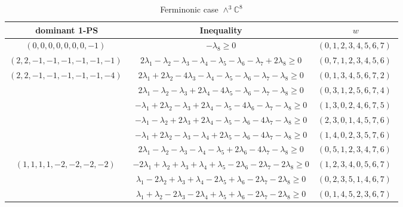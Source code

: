 \documentclass[11pt]{article}
\begin{document}
 
 \begin{longtable}[l]{|c|c|c|} 
 \caption{Ferminonic case $\wedge^{3}\mathbb{C}^{8}$} \\  
 
 \hline 
 \textrm{dominant 1-PS} & \textrm{Inequality} & $w$ \\ 
 \hline\multirow[t]{1}{*}{ $(0 ,0 ,0 ,0 ,0 ,0 ,0 ,-1) \;$ }  & $-\lambda_{8}\geq 0$ & $(0 ,1 ,2 ,3 ,4 ,5 ,6 ,7) \;$\\ \hline\multirow[t]{1}{*}{ $(2 ,2 ,-1 ,-1 ,-1 ,-1 ,-1 ,-1) \;$ }  & $2\lambda_{1}-\lambda_{2}-\lambda_{3}-\lambda_{4}-\lambda_{5}-\lambda_{6}-\lambda_{7} + 2\lambda_{8}\geq 0$ & $(0 ,7 ,1 ,2 ,3 ,4 ,5 ,6) \;$\\ \hline\multirow[t]{6}{*}{ $(2 ,2 ,-1 ,-1 ,-1 ,-1 ,-1 ,-4) \;$ }  & $2\lambda_{1} + 2\lambda_{2}-4\lambda_{3}-\lambda_{4}-\lambda_{5}-\lambda_{6}-\lambda_{7}-\lambda_{8}\geq 0$ & $(0 ,1 ,3 ,4 ,5 ,6 ,7 ,2) \;$\\ 
 \cline{2-3} 
 & $2\lambda_{1}-\lambda_{2}-\lambda_{3} + 2\lambda_{4}-4\lambda_{5}-\lambda_{6}-\lambda_{7}-\lambda_{8}\geq 0$ & $(0 ,3 ,1 ,2 ,5 ,6 ,7 ,4) \;$\\ 
 \cline{2-3} 
 & $-\lambda_{1} + 2\lambda_{2}-\lambda_{3} + 2\lambda_{4}-\lambda_{5}-4\lambda_{6}-\lambda_{7}-\lambda_{8}\geq 0$ & $(1 ,3 ,0 ,2 ,4 ,6 ,7 ,5) \;$\\ 
 \cline{2-3} 
 & $-\lambda_{1}-\lambda_{2} + 2\lambda_{3} + 2\lambda_{4}-\lambda_{5}-\lambda_{6}-4\lambda_{7}-\lambda_{8}\geq 0$ & $(2 ,3 ,0 ,1 ,4 ,5 ,7 ,6) \;$\\ 
 \cline{2-3} 
 & $-\lambda_{1} + 2\lambda_{2}-\lambda_{3}-\lambda_{4} + 2\lambda_{5}-\lambda_{6}-4\lambda_{7}-\lambda_{8}\geq 0$ & $(1 ,4 ,0 ,2 ,3 ,5 ,7 ,6) \;$\\ 
 \cline{2-3} 
 & $2\lambda_{1}-\lambda_{2}-\lambda_{3}-\lambda_{4}-\lambda_{5} + 2\lambda_{6}-4\lambda_{7}-\lambda_{8}\geq 0$ & $(0 ,5 ,1 ,2 ,3 ,4 ,7 ,6) \;$\\ \hline\multirow[t]{4}{*}{ $(1 ,1 ,1 ,1 ,-2 ,-2 ,-2 ,-2) \;$ }  & $-2\lambda_{1} + \lambda_{2} + \lambda_{3} + \lambda_{4} + \lambda_{5}-2\lambda_{6}-2\lambda_{7}-2\lambda_{8}\geq 0$ & $(1 ,2 ,3 ,4 ,0 ,5 ,6 ,7) \;$\\ 
 \cline{2-3} 
 & $\lambda_{1}-2\lambda_{2} + \lambda_{3} + \lambda_{4}-2\lambda_{5} + \lambda_{6}-2\lambda_{7}-2\lambda_{8}\geq 0$ & $(0 ,2 ,3 ,5 ,1 ,4 ,6 ,7) \;$\\ 
 \cline{2-3} 
 & $\lambda_{1} + \lambda_{2}-2\lambda_{3}-2\lambda_{4} + \lambda_{5} + \lambda_{6}-2\lambda_{7}-2\lambda_{8}\geq 0$ & $(0 ,1 ,4 ,5 ,2 ,3 ,6 ,7) \;$\\ 

\end{longtable}
\end{document}

